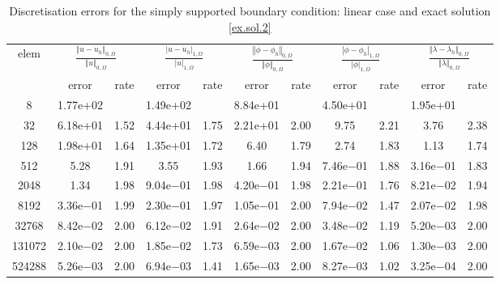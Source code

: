 \documentclass[a4paper,final]{siamltex}
\begin{document}
\begin{table}[htb!]
	\centering
	\caption{Discretisation errors  for the simply supported boundary condition: linear case and exact solution \eqref{ex.sol.2}}
	\begin{tabular}{|c|cc|cc|cc|cc|cc|}
		\hline
			\multirow{2}{*}{elem} & \multicolumn{2}{c|}{$\frac{\left\Vert u - u_h\right\Vert_{0,\Omega}}{\left\Vert u\right\Vert_{0,\Omega}}$} & \multicolumn{2}{c|}{$\frac{| u - u_h|_{1,\Omega}}{|u|_{1,\Omega}}$} & \multicolumn{2}{c|}{$\frac{\left\Vert \phi - \phi_h\right\Vert_{0,\Omega}}{\left\Vert \phi\right\Vert_{0,\Omega}}$} & \multicolumn{2}{c|}{$\frac{|\phi - \phi_h|_{1,\Omega}}{| \phi|_{1,\Omega}}$} & \multicolumn{2}{c|}{$\frac{\left\Vert \lambda - \lambda_h\right\Vert_{0,\Omega}}{\left\Vert \lambda\right\Vert_{0,\Omega}}$}\\ \hhline{~----------}
		& error & rate & error & rate & error & rate & error & rate & error & rate \\\hline
    8 & 1.77e+02 &   & 1.49e+02 &   & 8.84e+01 &          & 4.50e+01 &          & 1.95e+01 &          \\\hline
   32 & 6.18e+01 & 1.52 & 4.44e+01 & 1.75 & 2.21e+01 & 2.00 & 9.75 & 2.21 & 3.76 & 2.38 \\\hline
  128 & 1.98e+01 & 1.64 & 1.35e+01 & 1.72 & 6.40 & 1.79 & 2.74 & 1.83 & 1.13 & 1.74 \\\hline
  512 & 5.28 & 1.91 & 3.55 & 1.93 & 1.66 & 1.94 & 7.46e$-$01 & 1.88 & 3.16e$-$01 & 1.83 \\\hline
 2048 & 1.34 & 1.98 & 9.04e$-$01 & 1.98 & 4.20e$-$01 & 1.98 & 2.21e$-$01 & 1.76 & 8.21e$-$02 & 1.94 \\\hline
 8192 & 3.36e$-$01 & 1.99 & 2.30e$-$01 & 1.97 & 1.05e$-$01 & 2.00 & 7.94e$-$02 & 1.47 & 2.07e$-$02 & 1.98 \\\hline
32768 & 8.42e$-$02 & 2.00 & 6.12e$-$02 & 1.91 & 2.64e$-$02 & 2.00 & 3.48e$-$02 & 1.19 & 5.20e$-$03 & 2.00 \\\hline
131072 & 2.10e$-$02 & 2.00 & 1.85e$-$02 & 1.73 & 6.59e$-$03 & 2.00 & 1.67e$-$02 & 1.06 & 1.30e$-$03 & 2.00 \\\hline
524288 & 5.26e$-$03 & 2.00 & 6.94e$-$03 & 1.41 & 1.65e$-$03 & 2.00 & 8.27e$-$03 & 1.02 & 3.25e$-$04 & 2.00 \\\hline
	\end{tabular}
	\label{ss2:linear}
\end{table}
\end{document}
